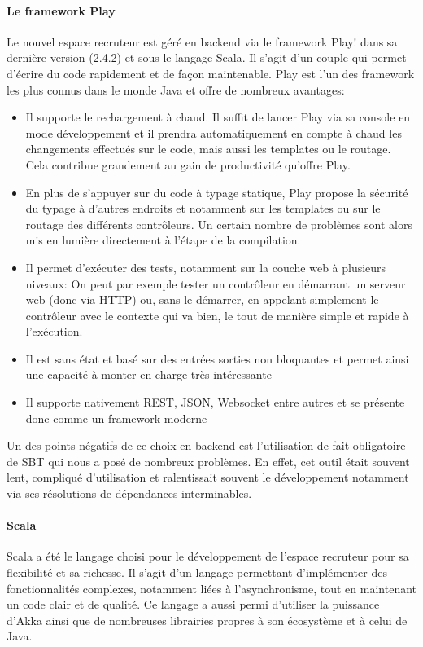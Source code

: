 \paragraph{Le framework Play}
Le nouvel espace recruteur est géré en backend via le framework Play! dans sa dernière version (2.4.2) et sous le langage Scala.
Il s'agit d'un couple qui permet d'écrire du code rapidement et de façon maintenable.
Play est l'un des framework les plus connus dans le monde Java et offre de nombreux avantages:
\begin{itemize}
  \item Il supporte le rechargement à chaud.
  Il suffit de lancer Play via sa console en mode développement et il prendra automatiquement en compte à chaud les changements effectués sur le code, mais aussi les templates ou le routage.
  Cela contribue grandement au gain de productivité qu'offre Play.
  \item En plus de s’appuyer sur du code à typage statique, Play propose la sécurité du typage à d’autres endroits et notamment sur les templates ou sur le routage des différents contrôleurs.
  Un certain nombre de problèmes sont alors mis en lumière directement à l’étape de la compilation.
  \item Il permet d'exécuter des tests, notamment sur la couche web à plusieurs niveaux:
  On peut par exemple tester un contrôleur en démarrant un serveur web (donc via HTTP) ou, sans le démarrer, en appelant simplement le contrôleur avec le contexte qui va bien, le tout de manière simple et rapide à l’exécution.
  \item Il est sans état et basé sur des entrées sorties non bloquantes et permet ainsi une capacité à monter en charge très intéressante
  \item Il supporte nativement REST, JSON, Websocket entre autres et se présente donc comme un framework moderne
\end{itemize}
Un des points négatifs de ce choix en backend est l'utilisation de fait obligatoire de SBT qui nous a posé de nombreux problèmes.
En effet, cet outil était souvent lent, compliqué d'utilisation et ralentissait souvent le développement notamment via ses résolutions de dépendances interminables.
\paragraph{Scala}
Scala a été le langage choisi pour le développement de l'espace recruteur pour sa flexibilité et sa richesse.
Il s'agit d'un langage permettant d'implémenter des fonctionnalités complexes, notamment liées à l'asynchronisme, tout en maintenant un code clair et de qualité.
Ce langage a aussi permi d'utiliser la puissance d'Akka ainsi que de nombreuses librairies propres à son écosystème et à celui de Java.
